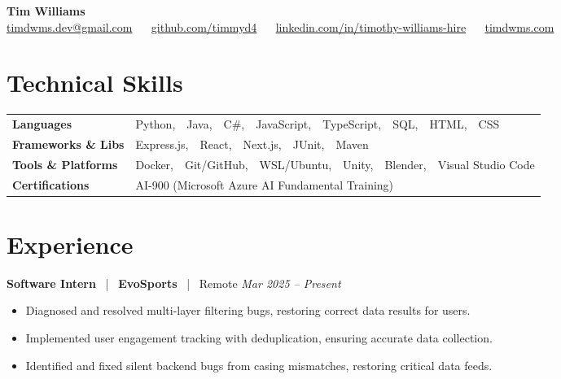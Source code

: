 \documentclass[10pt, letterpaper]{article}
\newcommand{\jobhead}[4]{%
  \vspace{5pt}%
  {\bfseries\color{dark}#1}%
  ~{\color{light}|}~%
  {\bfseries\color{navy}#2}%
  ~{\color{light}|}~%
  {\color{light}#3}%
  \hfill{\color{light}\small\textit{#4}}\\[-2pt]%
}
\newcommand{\skillrow}[2]{%
  {\bfseries #1} & #2 \\[2pt]%
}
\begin{document}

\begin{center}
  {\huge\bfseries\color{navy} Tim Williams}\\[4pt]
  {\small\color{light}
    \href{mailto:timdwms.dev@gmail.com}{timdwms.dev@gmail.com}
    ~\textbullet~
    \href{https://github.com/timmyd4}{github.com/timmyd4}
    ~\textbullet~
    \href{https://www.linkedin.com/in/timothy-williams-hire}{linkedin.com/in/timothy-williams-hire}
    ~\textbullet~
    \href{https://timdwms.com}{timdwms.com}
  }
\end{center}

\vspace{2pt}

\section{Technical Skills}

\begin{tabular}{@{}p{1.6in} p{5.2in}@{}}
  \skillrow{Languages}{Python,\ \ Java,\ \ C\#,\ \ JavaScript,\ \ TypeScript,\ \ SQL,\ \ HTML,\ \ CSS}
  \skillrow{Frameworks \& Libs}{Express.js,\ \ React,\ \ Next.js,\ \ JUnit,\ \ Maven}
  \skillrow{Tools \& Platforms}{Docker,\ \ Git/GitHub,\ \ WSL/Ubuntu,\ \ Unity,\ \ Blender,\ \ Visual Studio Code}
  \skillrow{Certifications}{AI-900 (Microsoft Azure AI Fundamental Training)}
\end{tabular}

\section{Experience}

\jobhead{Software Intern}{EvoSports}{Remote}{Mar 2025 – Present}
\begin{itemize}
  \item Diagnosed and resolved multi-layer filtering bugs, restoring correct data results for users.
  \item Implemented user engagement tracking with deduplication, ensuring accurate data collection.
  \item Identified and fixed silent backend bugs from casing mismatches, restoring critical data feeds.
\end{itemize}
\end{document}
